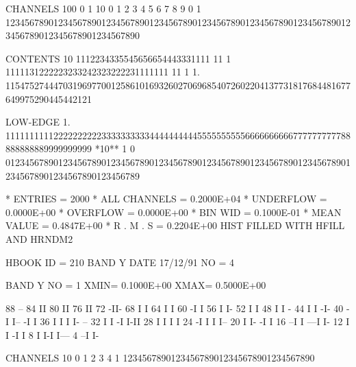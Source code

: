 \begin{Listing}
 CHANNELS 100   0                                                                                                  1   
           10   0        1         2         3         4         5         6         7         8         9         0   
            1   1234567890123456789012345678901234567890123456789012345678901234567890123456789012345678901234567890   
 
 CONTENTS  10                   1112234335545656654443331111 11 1   1111131222223233242323222231111111 11 1         
            1.            115475274447031969770012586101693260270696854072602204137731817684481677649975290445442121
 
 LOW-EDGE   1.            111111111122222222223333333333444444444455555555556666666666777777777788888888889999999999
 *10**  1   0   0123456789012345678901234567890123456789012345678901234567890123456789012345678901234567890123456789
 
 * ENTRIES =       2000      * ALL CHANNELS = 0.2000E+04      * UNDERFLOW = 0.0000E+00      * OVERFLOW = 0.0000E+00
 * BIN WID = 0.1000E-01      * MEAN VALUE   = 0.4847E+00      * R . M . S = 0.2204E+00
\newpage
 HIST FILLED WITH HFILL AND HRNDM2                                               
 
 HBOOK     ID =       210             BAND Y                     DATE  17/12/91              NO =   4
 
 BAND Y      NO =   1     XMIN=  0.1000E+00  XMAX=  0.5000E+00
 
       88                  --
       84                  II
       80                  II
       76                  II
       72                 -II-
       68                 I  I
       64                 I  I
       60                -I  I
       56                I   I-
       52                I    I
       48                I    I            -
       44                I    I           -I-
       40               -I    I--        -I I
       36               I       I        I  I- --
       32               I       I       -I   I-II
       28               I       I       I       I
       24              -I       I       I       I--
       20              I        I-     -I         I
       16            --I         I  ---I          I-
       12            I           I -I              I
        8            I           I-I               I---
        4          --I                                I-
 
 CHANNELS  10   0        1         2         3         4   
            1   1234567890123456789012345678901234567890   
 

\end{Listing}
